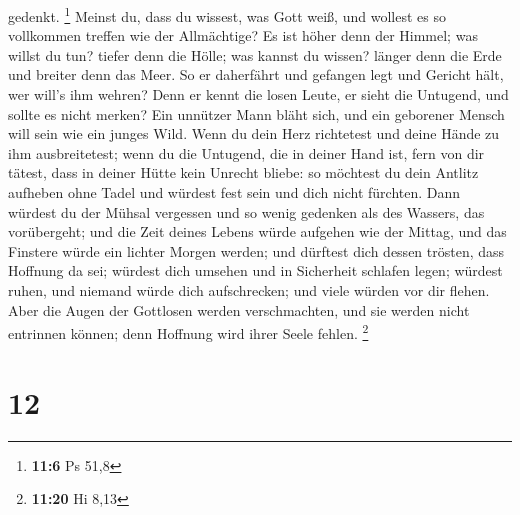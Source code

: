 gedenkt. \footnote{\textbf{11:6} Ps 51,8}  Meinst du, dass
du wissest, was Gott weiß, und wollest es so vollkommen treffen wie der
Allmächtige?  Es ist höher denn der Himmel; was willst du
tun? tiefer denn die Hölle; was kannst du wissen?  länger
denn die Erde und breiter denn das Meer.  So er
daherfährt und gefangen legt und Gericht hält, wer will's ihm wehren?
 Denn er kennt die losen Leute, er sieht die Untugend,
und sollte es nicht merken?  Ein unnützer Mann bläht
sich, und ein geborener Mensch will sein wie ein junges Wild.
 Wenn du dein Herz richtetest und deine Hände zu ihm
ausbreitetest;  wenn du die Untugend, die in deiner Hand
ist, fern von dir tätest, dass in deiner Hütte kein Unrecht bliebe:
 so möchtest du dein Antlitz aufheben ohne Tadel und
würdest fest sein und dich nicht fürchten.  Dann würdest
du der Mühsal vergessen und so wenig gedenken als des Wassers, das
vorübergeht;  und die Zeit deines Lebens würde aufgehen
wie der Mittag, und das Finstere würde ein lichter Morgen werden;
 und dürftest dich dessen trösten, dass Hoffnung da sei;
würdest dich umsehen und in Sicherheit schlafen legen; 
würdest ruhen, und niemand würde dich aufschrecken; und viele würden vor
dir flehen.  Aber die Augen der Gottlosen werden
verschmachten, und sie werden nicht entrinnen können; denn Hoffnung wird
ihrer Seele fehlen. \footnote{\textbf{11:20} Hi 8,13}

\hypertarget{section-1}{%
\section{12}\label{section-1}}

